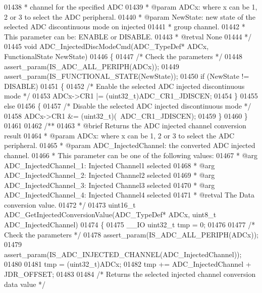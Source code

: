 \begin{DoxyCode}
01438 \textcolor{comment}{  *         channel for the specified ADC}
01439 \textcolor{comment}{  * @param  ADCx: where x can be 1, 2 or 3 to select the ADC peripheral.}
01440 \textcolor{comment}{  * @param  NewState: new state of the selected ADC discontinuous mode on injected}
01441 \textcolor{comment}{  *         group channel.}
01442 \textcolor{comment}{  *          This parameter can be: ENABLE or DISABLE.}
01443 \textcolor{comment}{  * @retval None}
01444 \textcolor{comment}{  */}
01445 \textcolor{keywordtype}{void} ADC_InjectedDiscModeCmd(ADC\_TypeDef* ADCx, FunctionalState NewState)
01446 \{
01447   \textcolor{comment}{/* Check the parameters */}
01448   assert_param(IS\_ADC\_ALL\_PERIPH(ADCx));
01449   assert_param(IS\_FUNCTIONAL\_STATE(NewState));
01450   \textcolor{keywordflow}{if} (NewState != DISABLE)
01451   \{
01452     \textcolor{comment}{/* Enable the selected ADC injected discontinuous mode */}
01453     ADCx->CR1 |= (uint32\_t)ADC_CR1_JDISCEN;
01454   \}
01455   \textcolor{keywordflow}{else}
01456   \{
01457     \textcolor{comment}{/* Disable the selected ADC injected discontinuous mode */}
01458     ADCx->CR1 &= (uint32\_t)(~ADC_CR1_JDISCEN);
01459   \}
01460 \}
01461 
01462 \textcolor{comment}{/**}
01463 \textcolor{comment}{  * @brief  Returns the ADC injected channel conversion result}
01464 \textcolor{comment}{  * @param  ADCx: where x can be 1, 2 or 3 to select the ADC peripheral.}
01465 \textcolor{comment}{  * @param  ADC\_InjectedChannel: the converted ADC injected channel.}
01466 \textcolor{comment}{  *          This parameter can be one of the following values:}
01467 \textcolor{comment}{  *            @arg ADC\_InjectedChannel\_1: Injected Channel1 selected}
01468 \textcolor{comment}{  *            @arg ADC\_InjectedChannel\_2: Injected Channel2 selected}
01469 \textcolor{comment}{  *            @arg ADC\_InjectedChannel\_3: Injected Channel3 selected}
01470 \textcolor{comment}{  *            @arg ADC\_InjectedChannel\_4: Injected Channel4 selected}
01471 \textcolor{comment}{  * @retval The Data conversion value.}
01472 \textcolor{comment}{  */}
01473 uint16\_t ADC_GetInjectedConversionValue(ADC\_TypeDef* ADCx, uint8\_t ADC\_InjectedChannel)
01474 \{
01475   \_\_IO uint32\_t tmp = 0;
01476 
01477   \textcolor{comment}{/* Check the parameters */}
01478   assert_param(IS\_ADC\_ALL\_PERIPH(ADCx));
01479   assert_param(IS\_ADC\_INJECTED\_CHANNEL(ADC\_InjectedChannel));
01480 
01481   tmp = (uint32\_t)ADCx;
01482   tmp += ADC\_InjectedChannel + JDR_OFFSET;
01483 
01484   \textcolor{comment}{/* Returns the selected injected channel conversion data value */}

\end{DoxyCode}
